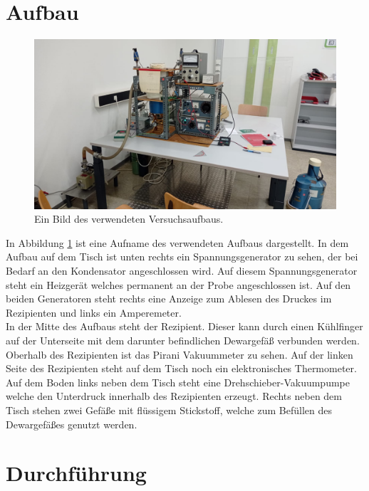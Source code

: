 \newpage
\section{Aufbau}
	\begin{figure}
        \centering
        \includegraphics[width = \textwidth]{latex/images/Aufbau.jpeg}
        \caption{Ein Bild des verwendeten Versuchsaufbaus.}
        \label{fig:Aufb}
    \end{figure}
    \noindent
    In Abbildung \ref{fig:Aufb} ist  eine Aufname des verwendeten Aufbaus dargestellt. 
    In dem Aufbau auf dem Tisch ist unten rechts ein Spannungsgenerator zu sehen, der bei Bedarf an den Kondensator angeschlossen wird.
    Auf diesem Spannungsgenerator steht ein Heizgerät welches permanent an der Probe angeschlossen ist.
    Auf den beiden Generatoren steht rechts eine Anzeige zum Ablesen des Druckes im Rezipienten und links ein Amperemeter.\\
    In der Mitte des Aufbaus steht der Rezipient. Dieser kann durch einen Kühlfinger auf der Unterseite mit dem darunter befindlichen Dewargefäß verbunden werden.
    Oberhalb des Rezipienten ist das Pirani Vakuummeter zu sehen.
    Auf der linken Seite des Rezipienten steht auf dem Tisch noch ein elektronisches Thermometer.
    Auf dem Boden links neben dem Tisch steht eine Drehschieber-Vakuumpumpe welche den Unterdruck innerhalb des Rezipienten erzeugt.
    Rechts neben dem Tisch stehen zwei Gefäße mit flüssigem Stickstoff, welche zum Befüllen des Dewargefäßes genutzt werden.
     
\section{Durchführung}

